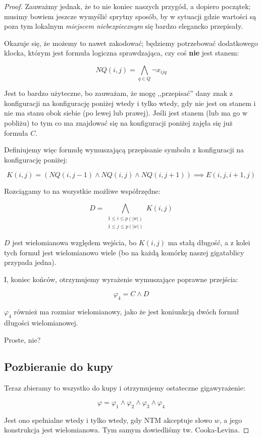 \begin{proof}
        Zauważmy jednak, że to nie koniec naszych przygód, a dopiero początek; musimy bowiem jeszcze wymyślić sprytny sposób, by w sytuacji gdzie wartości są poza tym lokalnym \textit{miejscem niebezpiecznym} się bardzo elegancko przepisały. 
        
        Okazuje się, że możemy to nawet zakodować; będziemy potrzebować dodatkowego klocka, którym jest formuła logiczna sprawdzająca, czy coś \textbf{nie} jest stanem:
        
        \[
            NQ(i,j) = \bigwedge_{q \in Q} \neg x_{ijq}
        \]
        
        Jest to bardzo użyteczne, bo zauważam, że mogę ,,przepisać'' dany znak z konfiguracji na konfigurację poniżej wtedy i tylko wtedy, gdy nie jest on stanem i nie ma stanu obok siebie (po lewej lub prawej). Jeśli jest stanem (lub ma go w pobliżu) to tym co ma znajdować się na konfiguracji poniżej zajęła się już formuła \(C\).
        
        Definiujemy więc formułę wymuszającą przepisanie symbolu z konfiguracji na konfigurację poniżej: 
        
        \[ 
            K(i,j) = (NQ(i, j-1) \land NQ(i,j) \land NQ(i, j+1)) \implies E(i, j, i+1, j)
        \]
        
        Rozciągamy to na wszystkie możliwe współrzędne:
        
        \[ 
            D = \bigwedge_{\substack{1 \leq i \leq p(|w|) \\ 1 \leq j \leq p(|w|)}} K(i,j)
        \]
        
        \(D\) jest wielomianowa względem wejścia, bo \(K(i,j)\) ma stałą długość, a z kolei tych formuł jest wielomianowo wiele (bo na każdą komórkę naszej gigatablicy przypada jedna).
        
        I, koniec końców, otrzymujemy wyrażenie wymuszające poprawne przejścia: 
        
        \[ 
            \varphi_4 = C \land D
        \]
        
        \(\varphi_4\) również ma rozmiar wielomianowy, jako że jest koniunkcją dwóch formuł długości wielomianowej. 
        
        Proste, nie?
        
        \subsection{Pozbieranie do kupy}
        
        Teraz zbieramy to wszystko do kupy i otrzymujemy ostateczne gigawyrażenie:
        
        \[ 
            \varphi = \varphi_1 \land \varphi_2 \land \varphi_3 \land \varphi_4
        \]
        
        Jest ono spełnialne wtedy i tylko wtedy, gdy NTM akceptuje słowo \(w\), a jego konstrukcja jest wielomianowa. Tym samym dowiedliśmy tw. Cooka-Levina.
\end{proof}